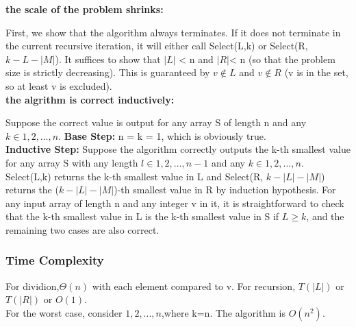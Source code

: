 \begin{prf}
\textbf{the scale of the problem shrinks:}

First, we show that the algorithm always terminates. If it does not terminate in the
current recursive iteration, it will either call Select(L,k) or Select(R, $k - L - |M|$).
It suffices to show that $|L|$ < n and $|R| $< n (so that the problem size is strictly
decreasing). This is guaranteed by $v \notin L$ and $v \notin R$ (v is in the set, so at least v is excluded).
\\
\textbf{the algrithm is correct inductively:}

Suppose the correct value is output for any array S of length n and any $k \in {1,2,\ldots,n}$. 
\textbf{Base Step:} n = k = 1, which is obviously true.\\
\textbf{Inductive Step:} Suppose the algorithm correctly outputs the k-th smallest value for
any array S with any length $l \in {1,2,\ldots,n-1}$ and any $k \in {1,2,\ldots,n}$.\\
Select(L,k) returns the k-th smallest value in L and Select(R, $k-|L|-|M|$) returns
the ($k-|L|-|M|$)-th smallest value in R by induction hypothesis.
For any input array of length n and any integer v in it, it is straightforward to check
that the k-th smallest value in L is the k-th smallest value in S if $L \geq k$, and the
remaining two cases are also correct.

\end{prf}

\subsubsection{Time Complexity}
For dividion,$\varTheta  (n)$ with each element compared to v. For recursion, $T(|L|)$ or $T(|R|)$ or $O(1)$.\\
For the worst case, consider ${1,2,...,n}$,where k=n. The algorithm is $O(n^2)$.


